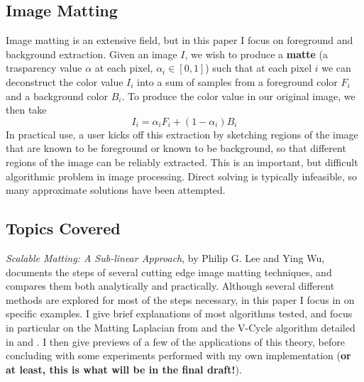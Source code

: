 \subsection{Image Matting}
Image matting is an extensive field, but in this paper I focus on foreground and background extraction. Given an image $I$, we wish to produce a \textbf{matte} (a trasparency value $\alpha$ at each pixel, $\alpha_{i}\in[0,1]$) such that at each pixel $i$ we can deconstruct the color value $I_{i}$ into a sum of samples from a foreground color $F_{i}$ and a background color $B_{i}$. To produce the color value in our original image, we then take
\[I_{i}=\alpha_{i}F_{i}+(1-\alpha_{i})B_{i}\]
In practical use, a user kicks off this extraction by sketching regions of the image that are known to be foreground or known to be background, so that different regions of the image can be reliably extracted. This is an important, but difficult algorithmic problem in image processing. Direct solving is typically infeasible, so many approximate solutions have been attempted.
\subsection{Topics Covered}
\textit{Scalable Matting: A Sub-linear Approach}, by Philip G. Lee and Ying Wu, documents the steps of several cutting edge image matting techniques, and compares them both analytically and practically. Although several different methods are explored for most of the steps necessary, in this paper I focus in on specific examples. I give brief explanations of most algorithms tested, and focus in particular on the Matting Laplacian from \cite{levin08} and the V-Cycle algorithm detailed in \cite{briggs87} and \cite{bramble93}. I then give previews of a few of the applications of this theory, before concluding with some experiments performed with my own implementation (\textbf{or at least, this is what will be in the final draft!}).